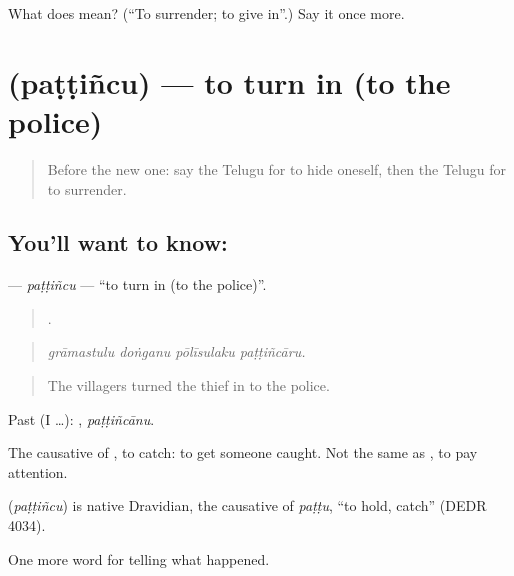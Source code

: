\begin{tcolorbox}[breakable,colback=teal!4,colframe=teal!35!black,title={Before you move on}]
What does  mean? (\textquotedblleft{}To surrender; to give in\textquotedblright{}.) Say it once more.
\end{tcolorbox}
\section[\texorpdfstring{\te{పట్టించు} (paṭṭiñcu)}{పట్టించు (paṭṭiñcu)}]{ (paṭṭiñcu) — to turn in (to the police)}

\label{lesson:TE-C352-pattincu}



\begin{quote}
Before the new one: say the Telugu for to hide oneself, then the Telugu for to surrender.
\end{quote}

\subsection*{You'll want to know: }
\textbf{} — \emph{paṭṭiñcu} — \textquotedblleft{}to turn in (to the police)\textquotedblright{}.

\begin{quote}
   .
\end{quote}

\begin{quote}
\emph{grāmastulu doṅganu pōlīsulaku paṭṭiñcāru.}
\end{quote}

\begin{quote}
The villagers turned the thief in to the police.
\end{quote}

Past (I …): , \emph{paṭṭiñcānu}.

The causative of , to catch: to get someone caught. Not the same as , to pay attention.

\begin{cousinweb}
\textbf{} (\emph{paṭṭiñcu}) is native Dravidian, the causative of \emph{paṭṭu}, \textquotedblleft{}to hold, catch\textquotedblright{} (DEDR 4034).
\end{cousinweb}

\begin{grammarlens}[title={What you've built}]
One more word for telling what happened.
\end{grammarlens}

